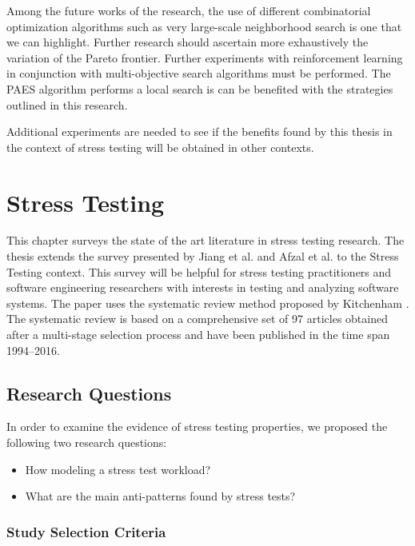 \documentclass[espaco=umemeio,chapter=TITLE,twoside,openright]{abnt}
\begin{document}
Among the future works of the research, the use of different combinatorial optimization algorithms such as very large-scale neighborhood search is one that we can highlight. Further research should ascertain more exhaustively the variation of the Pareto frontier. Further experiments with reinforcement learning in conjunction with multi-objective search algorithms must be performed. The PAES algorithm performs a local search is can be benefited with the strategies outlined in this research. 

Additional experiments are needed to see if the benefits found by this thesis in the context of stress testing will be obtained in other contexts.



\appendix





\chapter{Stress Testing}


This chapter surveys the state of the art literature in stress testing research. The thesis extends the survey presented by Jiang et al. \cite{Jiang2010}  and Afzal et al. \cite{Afzal2009a} to the Stress Testing context.  This survey will be helpful for stress testing practitioners and software engineering researchers with interests in testing and analyzing software systems. The paper uses the systematic review method proposed by Kitchenham \cite{Kitchenham2007}. The systematic review is based on a comprehensive set of 97 articles obtained after a multi-stage selection process and have been published in the time span 1994–2016.

\section{Research Questions}

In order to examine the evidence of stress testing properties, we proposed the following two research questions:


\begin{itemize}
\item How modeling a stress test workload?
\item What are the main anti-patterns found by stress tests?
\end{itemize}


\subsection{Study Selection Criteria}
\end{document}
